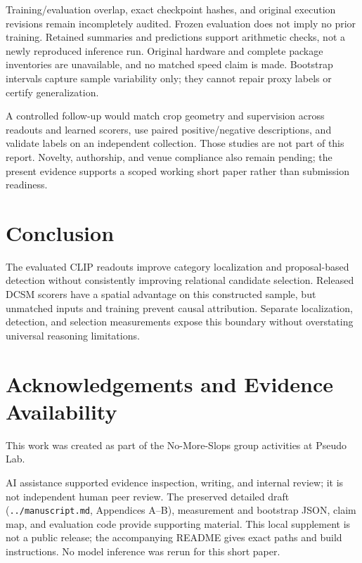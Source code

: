 \documentclass[10pt,twocolumn,letterpaper]{article}
\begin{document}
Training/evaluation overlap, exact checkpoint hashes, and original
execution revisions remain incompletely audited. Frozen evaluation does
not imply no prior training. Retained summaries and predictions support
arithmetic checks, not a newly reproduced inference run. Original
hardware and complete package inventories are unavailable, and no
matched speed claim is made. Bootstrap intervals capture sample
variability only; they cannot repair proxy labels or certify
generalization.

A controlled follow-up would match crop geometry and supervision across
readouts and learned scorers, use paired positive/negative descriptions,
and validate labels on an independent collection. Those studies are not
part of this report. Novelty, authorship, and venue compliance also
remain pending; the present evidence supports a scoped working short
paper rather than submission readiness.

\section{Conclusion}\label{conclusion}

The evaluated CLIP readouts improve category localization and
proposal-based detection without consistently improving relational
candidate selection. Released DCSM scorers have a spatial advantage on
this constructed sample, but unmatched inputs and training prevent
causal attribution. Separate localization, detection, and selection
measurements expose this boundary without overstating universal
reasoning limitations.

\section{Acknowledgements and Evidence
Availability}\label{acknowledgements-and-evidence-availability}

This work was created as part of the No-More-Slops group activities at
Pseudo Lab.

AI assistance supported evidence inspection, writing, and internal
review; it is not independent human peer review. The preserved detailed
draft (\texttt{../manuscript.md}, Appendices A--B), measurement and
bootstrap JSON, claim map, and evaluation code provide supporting
material. This local supplement is not a public release; the
accompanying README gives exact paths and build instructions. No model
inference was rerun for this short paper.

\label{main-text-end}
\clearpage
\nobalance


\end{document}
